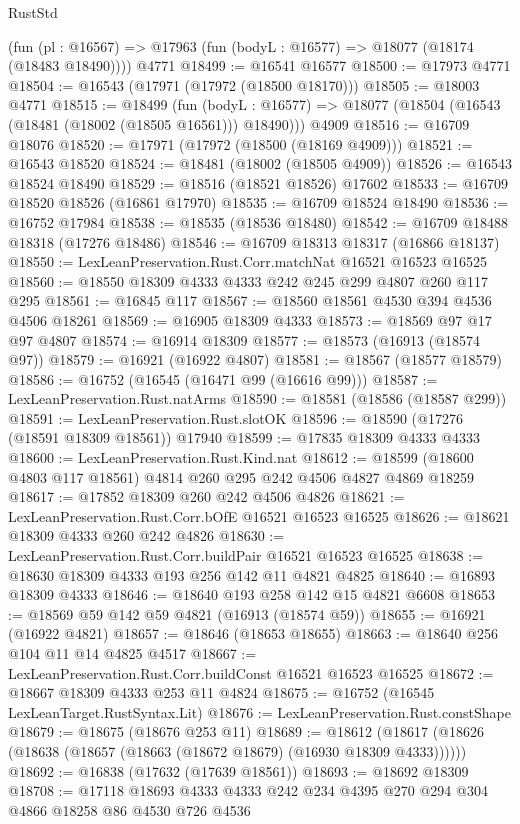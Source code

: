 \begin{lexlean}{RustStd}
\begin{coremodule}
    (fun (pl : @16567) => @17963 (fun (bodyL : @16577) => @18077 (@18174 (@18483 @18490))))
    @4771
@18499 := @16541 @16577
@18500 := @17973 @4771
@18504 := @16543 (@17971 (@17972 (@18500 @18170)))
@18505 := @18003 @4771
@18515 := @18499
    (fun (bodyL : @16577) => @18077 (@18504 (@16543 (@18481 (@18002 (@18505 @16561))) @18490)))
    @4909
@18516 := @16709 @18076
@18520 := @17971 (@17972 (@18500 (@18169 @4909)))
@18521 := @16543 @18520
@18524 := @18481 (@18002 (@18505 @4909))
@18526 := @16543 @18524 @18490
@18529 := @18516 (@18521 @18526) @17602
@18533 := @16709 @18520 @18526 (@16861 @17970)
@18535 := @16709 @18524 @18490
@18536 := @16752 @17984
@18538 := @18535 (@18536 @18480)
@18542 := @16709 @18488 @18318 (@17276 @18486)
@18546 := @16709 @18313 @18317 (@16866 @18137)
@18550 := LexLeanPreservation.Rust.Corr.matchNat @16521 @16523 @16525
@18560 := @18550 @18309 @4333 @4333 @242 @245 @299 @4807 @260 @117 @295
@18561 := @16845 @117
@18567 := @18560 @18561 @4530 @394 @4536 @4506 @18261
@18569 := @16905 @18309 @4333
@18573 := @18569 @97 @17 @97 @4807
@18574 := @16914 @18309
@18577 := @18573 (@16913 (@18574 @97))
@18579 := @16921 (@16922 @4807)
@18581 := @18567 (@18577 @18579)
@18586 := @16752 (@16545 (@16471 @99 (@16616 @99)))
@18587 := LexLeanPreservation.Rust.natArms
@18590 := @18581 (@18586 (@18587 @299))
@18591 := LexLeanPreservation.Rust.slotOK
@18596 := @18590 (@17276 (@18591 @18309 @18561)) @17940
@18599 := @17835 @18309 @4333 @4333
@18600 := LexLeanPreservation.Rust.Kind.nat
@18612 := @18599 (@18600 @4803 @117 @18561) @4814 @260 @295 @242 @4506 @4827 @4869 @18259
@18617 := @17852 @18309 @260 @242 @4506 @4826
@18621 := LexLeanPreservation.Rust.Corr.bOfE @16521 @16523 @16525
@18626 := @18621 @18309 @4333 @260 @242 @4826
@18630 := LexLeanPreservation.Rust.Corr.buildPair @16521 @16523 @16525
@18638 := @18630 @18309 @4333 @193 @256 @142 @11 @4821 @4825
@18640 := @16893 @18309 @4333
@18646 := @18640 @193 @258 @142 @15 @4821 @6608
@18653 := @18569 @59 @142 @59 @4821 (@16913 (@18574 @59))
@18655 := @16921 (@16922 @4821)
@18657 := @18646 (@18653 @18655)
@18663 := @18640 @256 @104 @11 @14 @4825 @4517
@18667 := LexLeanPreservation.Rust.Corr.buildConst @16521 @16523 @16525
@18672 := @18667 @18309 @4333 @253 @11 @4824
@18675 := @16752 (@16545 LexLeanTarget.RustSyntax.Lit)
@18676 := LexLeanPreservation.Rust.constShape
@18679 := @18675 (@18676 @253 @11)
@18689 := @18612 (@18617 (@18626 (@18638 (@18657 (@18663 (@18672 @18679) (@16930 @18309 @4333))))))
@18692 := @16838 (@17632 (@17639 @18561))
@18693 := @18692 @18309
@18708 := @17118 @18693 @4333 @4333 @242 @234 @4395 @270 @294 @304 @4866 @18258 @86 @4530 @726 @4536

\end{coremodule}
\end{lexlean}

